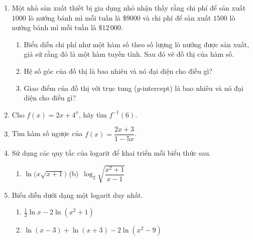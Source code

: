 \providecommand{\graphcalcicon}{%
\begin{tikzpicture}[scale=0.18, baseline=-0.6ex]
    \draw[stewartcyan, thick] (0,0) rectangle (1.4,1.4);
    \draw[stewartcyan, thin] (0,0.7) -- (1.4,0.7);
    \draw[stewartcyan, thin] (0.7,0) -- (0.7,1.4);
    \draw[stewartcyan, thick] (0.15,0.2) to[out=10, in=230] (0.7,0.7) to[out=50, in=190] (1.25,1.2);
\end{tikzpicture}%
}

\fancyhead[L]{}

\noindent
\begin{minipage}[t]{0.485\textwidth}
\begin{enumerate}[label=\textbf{\arabic*.}, leftmargin=*, start=24]
    \item Một nhà sản xuất thiết bị gia dụng nhỏ nhận thấy rằng chi phí để sản xuất $1000$ lò nướng bánh mì mỗi tuần là $\$9000$ và chi phí để sản xuất $1500$ lò nướng bánh mì mỗi tuần là $\$12\,000$.
    \begin{enumerate}[label=(\alph*), leftmargin=*]
        \item Biểu diễn chi phí như một hàm số theo số lượng lò nướng được sản xuất, giả sử rằng đó là một hàm tuyến tính. Sau đó vẽ đồ thị của hàm số.
        \item Hệ số góc của đồ thị là bao nhiêu và nó đại diện cho điều gì?
        \item Giao điểm của đồ thị với trục tung ($y$-intercept) là bao nhiêu và nó đại diện cho điều gì?
    \end{enumerate}

    \item Cho $f(x) = 2x + 4^x$, hãy tìm $f^{-1}(6)$.

    \item Tìm hàm số ngược của $f(x) = \dfrac{2x + 3}{1 - 5x}$.

    \item Sử dụng các quy tắc của logarit để khai triển mỗi biểu thức sau.
    \begin{enumerate}[label=(\alph*), leftmargin=*]
        \item $\ln\bigl(x\sqrt{x + 1}\bigr)$ \hspace{1.5cm} \textnormal{(b)}~$\log_2 \sqrt{\dfrac{x^2 + 1}{x - 1}}$
    \end{enumerate}

    \item Biểu diễn dưới dạng một logarit duy nhất.
    \begin{enumerate}[label=(\alph*), leftmargin=*]
        \item $\frac{1}{2} \ln x - 2\ln(x^2 + 1)$
        \item $\ln(x - 3) + \ln(x + 3) - 2\ln(x^2 - 9)$
    \end{enumerate}
\end{enumerate}


\end{minipage}
